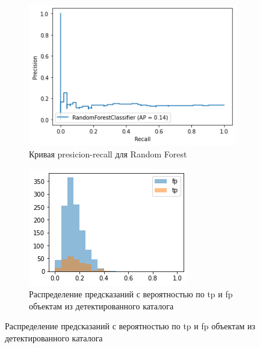 \documentclass{article}
\begin{document}
\begin{enumerate}
\begin{figure}[h]
            \begin{subfigure}{0.5\textwidth}
                \includegraphics[width=0.7\linewidth]{pres_recall} 
                \caption{Кривая presicion-recall для Random Forest}
            \end{subfigure}
            \begin{subfigure}{0.5\textwidth}
                \includegraphics[width=0.7\linewidth]{hist}
                \caption{Распределение предсказаний с вероятностью по tp и fp объектам из 
                    детектированного каталога}
            \end{subfigure}


\end{figure}
\end{enumerate}
\end{document}
